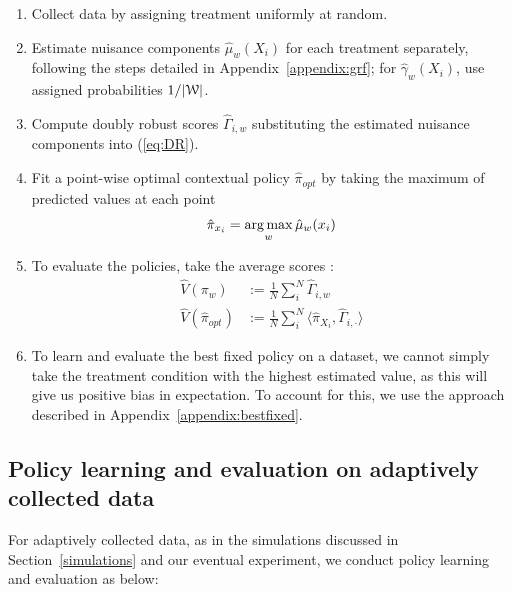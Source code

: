 \documentclass[letterpaper, 12pt, parskip=full,]{scrartcl}
\begin{document}
\begin{enumerate}
  \item Collect data by assigning treatment uniformly at random.
  \item Estimate nuisance components $\hat{\mu}_{w}(X_i)$ for each treatment separately, following the steps detailed in Appendix~\ref{appendix:grf}; for  $\hat\gamma_w(X_i)$, use assigned probabilities $1/|{\EuScript W}|$. 
  \item Compute doubly robust scores $\hat{\Gamma}_{i,w}$ substituting the estimated nuisance components into (\ref{eq:DR}). 
  \item Fit a point-wise optimal contextual policy $\hat{\pi}_{opt}$ by taking the maximum of predicted values at each point
    \begin{equation*}
\hat{\pi}_{x_i}  =     \operatorname*{arg\,max}_{w} \hat{\mu}_{w}(x_i) 
    \end{equation*}
  \item To evaluate the policies, take the average scores :
    \begin{align*}
          \hat{V}({\pi}_{w})  &:= \frac{1}{N} \sum_{i}^N \hat{\Gamma}_{i,w} \\
      \hat{V}(\hat{\pi}_{opt})  &:= \frac{1}{N} \sum_{i}^N\langle \hat{\pi}_{X_i}, \hat{\Gamma}_{i, \cdot}  \rangle
          \end{align*}
   \item To learn and evaluate the best fixed policy on a dataset, we cannot simply take the treatment condition with the highest estimated value, as this will give us positive bias in expectation. To account for this, we use the approach described in Appendix~\ref{appendix:bestfixed}. 
\end{enumerate}


\subsection{Policy learning and evaluation on adaptively collected data}\label{adaptiveearning}
For adaptively collected data, as in the simulations discussed in Section~\ref{simulations} and our eventual experiment, we conduct policy learning and evaluation as below:
\end{document}
